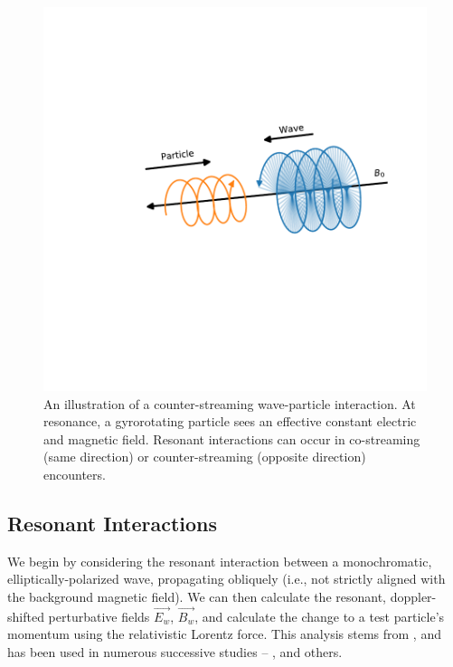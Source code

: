 \begin{figure}[h]
\begin{center}
\includegraphics{figures/resonant_interaction_cartoon.pdf}
\end{center}
\caption[Illustration of resonant wave-particle interactions]{An illustration of a counter-streaming wave-particle interaction. At resonance, a gyrorotating particle sees an effective constant electric and magnetic field. Resonant interactions can occur in co-streaming (same direction) or counter-streaming (opposite direction) encounters.}
\label{fig:resonant_interaction_cartoon}
\end{figure}

\subsection{Resonant Interactions}

We begin by considering the resonant interaction between a monochromatic, elliptically-polarized wave, propagating obliquely (i.e., not strictly aligned with the background magnetic field). We can then calculate the resonant, doppler-shifted perturbative fields $\vec{E_w}$, $\vec{B_w}$, and calculate the change to a test particle's momentum using the relativistic Lorentz force. This analysis stems from \cite{Bell1984}, and has been used in numerous successive studies -- \cite{Ristic1993, Lauben1998, Bortnik2005}, and others.

